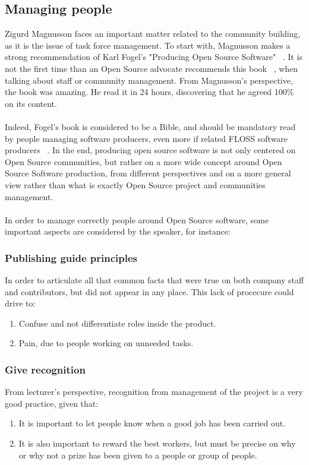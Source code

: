 \documentclass[11pt]{article}
\begin{document}
\subsection{Managing people}
  Zigurd Magnusson faces an important matter related to the community building, as it is the issue of task force management. To start with, Magnusson makes a strong recommendation of Karl Fogel's "Producing Open Source Software" ~\cite{FOGE00}. It is not the first time than an Open Source advocate recommends this book ~\cite{TALK01}, when talking about staff or community management. From Magnusson's perspective, the book was amazing. He read it in 24 hours, discovering that he agreed 100\% on its content.\\
\\
Indeed, Fogel's book is considered to be a Bible, and should be mandatory read by people managing software producers, even more if related FLOSS software producers ~\cite{TALK01}.  In the end, producing open source software is not only centered on Open Source communities, but rather on a more wide concept around Open Source Software production, from different perspectives and on a more general view rather than what is exactly Open Source project and communities management.\\
\\
In order to manage correctly people around Open Source software, some important aspects are considered by the speaker, for instance:

\subsubsection{Publishing guide principles}
In order to articulate all that common facts that were true on both company staff and contributors, but did not appear in any place. This lack of procecure could drive to:
\begin{enumerate}\itemsep0pt
\item{Confuse and not differentiate roles inside the product.}
\item{Pain, due to people working on unneeded tasks.}
\end{enumerate}

\subsubsection{Give recognition}
From lecturer's perspective, recognition from management of the project is a very good practice, given that:
\begin{enumerate}\itemsep0pt
\item{It is important to let people know when a good job has been carried out}.
\item{It is also important to reward the best workers, but must be precise on why or why not a prize has been given to a people or group of people}.
\end{enumerate}
\end{document}
